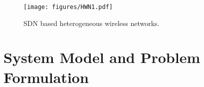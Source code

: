 \documentclass[conference]{IEEEtran}
\begin{document}




\begin{comment}
	
	\begin{figure}[htbp!]
	\centering
	\texttt{[image: figures/sdn.pdf]}
	\caption{SDN Network Architecture.  }
	\label{fig:sdn}
	\vspace{-1em}
	\end{figure}
	content...
\end{comment}



\begin{figure}[htbp!]
	\centering
	\texttt{[image: figures/HWN1.pdf]}
	\caption{SDN based heterogeneous  wireless networks.}\label{fig:HWN}
	\vspace{-1em}
\end{figure}


\section{System Model and Problem Formulation}



\end{document}
